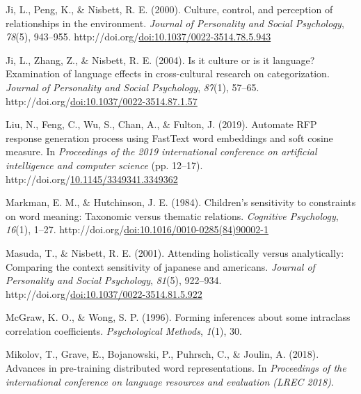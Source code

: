 \documentclass[10pt, letterpaper]{article}
\newenvironment{CSLReferences}%
  {}%
  {\par}
\begin{document}
\begin{CSLReferences}{1}{0}
\leavevmode{}%
Ji, L., Peng, K., \& Nisbett, R. E. (2000). Culture, control, and
perception of relationships in the environment. \emph{Journal of
Personality and Social Psychology}, \emph{78}(5), 943--955.
http://doi.org/\href{https://doi.org/doi:10.1037/0022-3514.78.5.943}{doi:10.1037/0022-3514.78.5.943}

\leavevmode{}%
Ji, L., Zhang, Z., \& Nisbett, R. E. (2004). Is it culture or is it
language? Examination of language effects in cross-cultural research on
categorization. \emph{Journal of Personality and Social Psychology},
\emph{87}(1), 57--65.
http://doi.org/\href{https://doi.org/doi:10.1037/0022-3514.87.1.57}{doi:10.1037/0022-3514.87.1.57}

\leavevmode{}%
Liu, N., Feng, C., Wu, S., Chan, A., \& Fulton, J. (2019). Automate RFP
response generation process using FastText word embeddings and soft
cosine measure. In \emph{Proceedings of the 2019 international
conference on artificial intelligence and computer science} (pp.
12--17).
http://doi.org/\href{https://doi.org/10.1145/3349341.3349362}{10.1145/3349341.3349362}

\leavevmode{}%
Markman, E. M., \& Hutchinson, J. E. (1984). Children's sensitivity to
constraints on word meaning: Taxonomic versus thematic relations.
\emph{Cognitive Psychology}, \emph{16}(1), 1--27.
http://doi.org/\href{https://doi.org/doi:10.1016/0010-0285(84)90002-1}{doi:10.1016/0010-0285(84)90002-1}

\leavevmode{}%
Masuda, T., \& Nisbett, R. E. (2001). Attending holistically versus
analytically: Comparing the context sensitivity of japanese and
americans. \emph{Journal of Personality and Social Psychology},
\emph{81}(5), 922--934.
http://doi.org/\href{https://doi.org/doi:10.1037/0022-3514.81.5.922}{doi:10.1037/0022-3514.81.5.922}

\leavevmode{}%
McGraw, K. O., \& Wong, S. P. (1996). Forming inferences about some
intraclass correlation coefficients. \emph{Psychological Methods},
\emph{1}(1), 30.

\leavevmode{}%
Mikolov, T., Grave, E., Bojanowski, P., Puhrsch, C., \& Joulin, A.
(2018). Advances in pre-training distributed word representations. In
\emph{Proceedings of the international conference on language resources
and evaluation (LREC 2018)}.


\end{CSLReferences}
\end{document}
